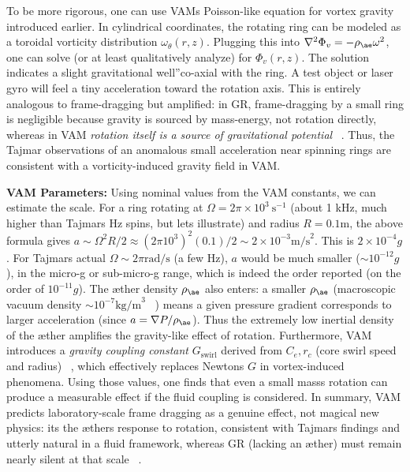 \documentclass[a4paper, aps,preprint,superscriptaddress, 12pt]{revtex4}
\begin{document}
To be more rigorous, one can use VAM\rqs s Poisson-like equation for vortex gravity introduced earlier. In cylindrical coordinates, the rotating ring can be modeled as a toroidal vorticity distribution $\omega_\theta(r,z)$. Plugging this into $\nabla^2\Phi_v = -\rho_{\ae}\omega^2$, one can solve (or at least qualitatively analyze) for $\Phi_v(r,z)$. The solution indicates a slight \grqq gravitational well\textquotedblright co-axial with the ring. A test object or laser gyro will feel a tiny acceleration toward the rotation axis. This is entirely analogous to frame-dragging but amplified: in GR, frame-dragging by a small ring is negligible because gravity is sourced by mass-energy, not rotation directly, whereas in VAM \textit{rotation itself is a source of gravitational potential}~\cite{Iskandarani2025b} . Thus, the Tajmar observations of an anomalous small acceleration near spinning rings are consistent with a vorticity-induced gravity field in VAM.


\textbf{VAM Parameters:} Using nominal values from the VAM constants, we can estimate the scale. For a ring rotating at $\Omega = 2\pi\times10^3~\text{s}^{-1}$ (about 1 kHz, much higher than Tajmar\rqs s Hz spins, but let\rqs s illustrate) and radius $R=0.1\text{m}$, the above formula gives $a \sim \Omega^2 R /2 \approx (2\pi 10^3)^2(0.1)/2 \sim 2\times10^{-3}\text{m/s}^2$. This is $2\times10^{-4}g$. For Tajmar\rqs s actual $\Omega \sim 2\pi\text{rad/s}$ (a few Hz), $a$ would be much smaller ($\sim10^{-12}g$), in the micro-g or sub-micro-g range, which is indeed the order reported (on the order of $10^{-11}g$). The æther density $\rho_{\ae}$ also enters: a smaller $\rho_{\ae}$ (macroscopic vacuum density $\sim10^{-7}\text{kg/m}^3$~\cite{VAM_constants} ) means a given pressure gradient corresponds to larger acceleration (since $a = \nabla P/\rho_{\ae}$). Thus the extremely low inertial density of the æther amplifies the gravity-like effect of rotation. Furthermore, VAM introduces a \textit{gravity coupling constant} $G_{\text{swirl}}$ derived from $C_e, r_c$ (core swirl speed and radius)~\cite{Iskandarani2025b} , which effectively replaces Newton\rqs s $G$ in vortex-induced phenomena. Using those values, one finds that even a small mass\rqs s rotation can produce a measurable effect if the fluid coupling is considered. In summary, VAM predicts laboratory-scale frame dragging as a genuine effect, not magical new physics: it\rqs s the æther\rqs s response to rotation, consistent with Tajmar\rqs s findings and utterly natural in a fluid framework, whereas GR (lacking an æther) must remain nearly silent at that scale~\cite{Iskandarani2025b} .
\end{document}
